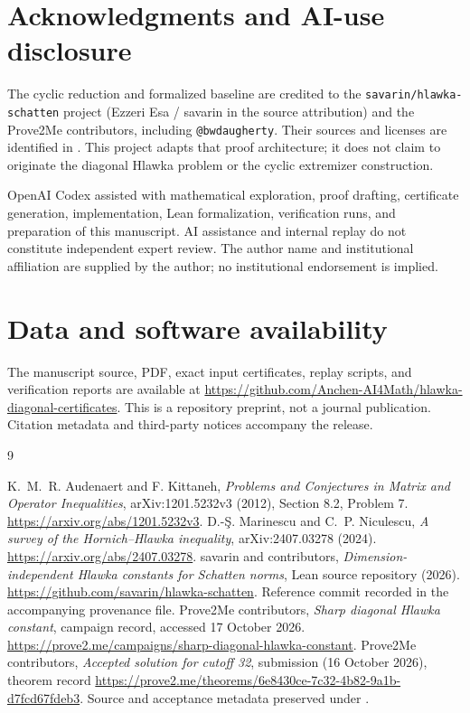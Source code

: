 \documentclass[11pt,a4paper]{article}
\theoremstyle{remark}\newtheorem{remark}[theorem]{Remark}
\newcommand{\repo}{\url{https://github.com/Anchen-AI4Math/hlawka-diagonal-certificates}}
\begin{document}
\section*{Acknowledgments and AI-use disclosure}
The cyclic reduction and formalized baseline are credited to the
\texttt{savarin/hlawka-schatten} project (Ezzeri Esa / savarin in the
source attribution) and the Prove2Me contributors, including
\texttt{@bwdaugherty}. Their sources and licenses are identified in
. This project adapts that proof architecture;
it does not claim to originate the diagonal Hlawka problem or the
cyclic extremizer construction.

OpenAI Codex assisted with mathematical exploration, proof drafting,
certificate generation, implementation, Lean formalization, verification
runs, and preparation
of this manuscript. AI assistance and internal replay do not constitute
independent expert review. The author name and institutional affiliation
are supplied by the author; no institutional endorsement is implied.

\section*{Data and software availability}
The manuscript source, PDF, exact input certificates, replay scripts,
and verification reports are available at \repo.
This is a repository preprint, not a journal publication. Citation
metadata and third-party notices accompany the release.

\begin{thebibliography}{9}
\raggedright
{} K.~M.~R. Audenaert and F. Kittaneh,
\emph{Problems and Conjectures in Matrix and Operator Inequalities},
arXiv:1201.5232v3 (2012), Section 8.2, Problem 7.
\url{https://arxiv.org/abs/1201.5232v3}.
 D.-\c{S}. Marinescu and C.~P. Niculescu,
\emph{A survey of the Hornich--Hlawka inequality},
arXiv:2407.03278 (2024). \url{https://arxiv.org/abs/2407.03278}.
 savarin and contributors,
\emph{Dimension-independent Hlawka constants for Schatten norms},
Lean source repository (2026). \url{https://github.com/savarin/hlawka-schatten}.
Reference commit recorded in the accompanying provenance file.
 Prove2Me contributors,
\emph{Sharp diagonal Hlawka constant}, campaign record, accessed
17 October 2026. \url{https://prove2.me/campaigns/sharp-diagonal-hlawka-constant}.
 Prove2Me contributors,
\emph{Accepted solution for cutoff 32}, submission
 (16 October 2026),
theorem record \url{https://prove2.me/theorems/6e8430ce-7c32-4b82-9a1b-d7fcd67fdeb3}.
Source and acceptance metadata preserved under .
\end{thebibliography}
\end{document}
